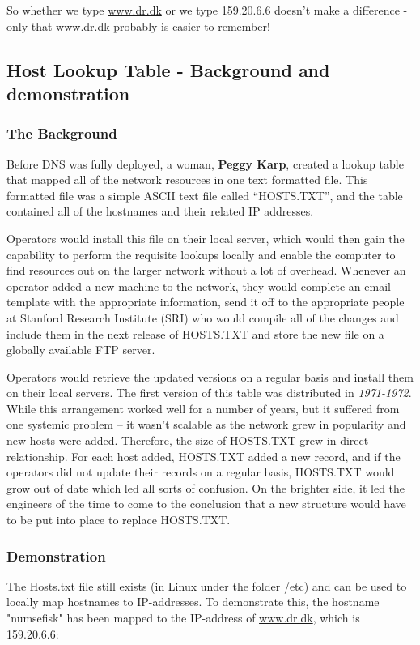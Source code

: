 So whether we type \url{www.dr.dk} or we type 159.20.6.6 doesn't make a difference - only that \url{www.dr.dk} probably is easier to remember! \\

\subsection{Host Lookup Table - Background and demonstration}

\subsubsection{The Background}
Before DNS was fully deployed, a woman, \textbf{Peggy Karp}, created a lookup table that mapped all of the network resources in one text formatted file. This formatted file was a simple ASCII text file called “HOSTS.TXT”, and the table contained all of the hostnames and their related IP addresses.

Operators would install this file on their local server, which would then gain the capability to perform the requisite lookups locally and enable the computer to find resources out on the larger network without a lot of overhead. Whenever an operator added a new machine to the network, they would complete an email template with the appropriate information, send it off to the appropriate people at Stanford Research Institute (SRI) who would compile all of the changes and include them in the next release of HOSTS.TXT and store the new file on a globally available FTP server.

Operators would retrieve the updated versions on a regular basis and install them on their local servers. The first version of this table was distributed in \textit{1971-1972}. While this arrangement worked well for a number of years, but it suffered from one systemic problem – it wasn’t scalable as the network grew in popularity and new hosts were added. Therefore, the size of HOSTS.TXT grew in direct relationship. For each host added, HOSTS.TXT added a new record, and if the operators did not update their records on a regular basis, HOSTS.TXT would grow out of date which led all sorts of confusion. On the brighter side, it led the engineers of the time to come to the conclusion that a new structure would have to be put into place to replace HOSTS.TXT.

\subsubsection{Demonstration}
The Hosts.txt file still exists (in Linux under the folder /etc) and can be used to locally map hostnames to IP-addresses. To demonstrate this, the hostname "numsefisk" has been mapped to the IP-address of \url{www.dr.dk}, which is 159.20.6.6:


